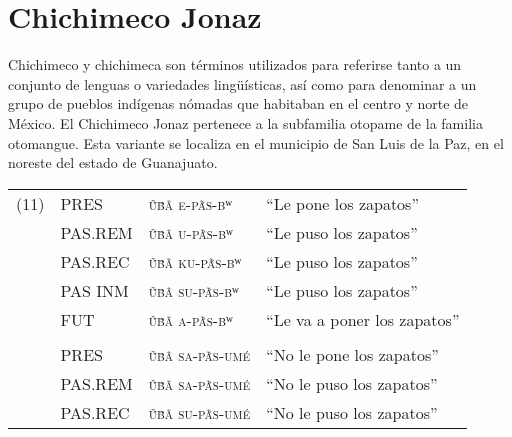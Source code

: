 \section*{Chichimeco Jonaz}

\noindent Chichimeco y chichimeca son términos utilizados para referirse tanto a un conjunto de lenguas o variedades lingüísticas, así como para denominar a un grupo de pueblos indígenas nómadas que habitaban en el centro y norte de México. El Chichimeco Jonaz pertenece a la subfamilia otopame de la familia otomangue. Esta variante se localiza en el municipio de San Luis de la Paz, en el noreste del estado de Guanajuato. \vspace{1cm}

{\setmainfont{Doulos SIL}
    \begin{tabular}{rlrr}
        \multicolumn{1}{l}{(11)} & PRES       & \multicolumn{1}{l}{\textsc{ṹβ̃ã e-pã́s-βʷ}}           & \multicolumn{1}{l}{“Le pone los zapatos”}          \\
                                 & PAS.REM    & \multicolumn{1}{l}{\textsc{ṹβ̃ã u-pã́s-βʷ}}           & \multicolumn{1}{l}{“Le puso los zapatos”}          \\
                                 & PAS.REC    & \multicolumn{1}{l}{\textsc{ṹβ̃ã ku-pã́s-βʷ}}          & \multicolumn{1}{l}{“Le puso los zapatos”}          \\
                                 & PAS INM    & \multicolumn{1}{l}{\textsc{ṹβ̃ã su-pã́s-βʷ}}          & \multicolumn{1}{l}{“Le puso los zapatos”}          \\
                                 & FUT        & \multicolumn{1}{l}{\textsc{ṹβ̃ã a-pã́s-βʷ}}           & \multicolumn{1}{l}{“Le va a poner los zapatos”}    \\
                                 &            &                                                     &                                                    \\
                                 & PRES       & \multicolumn{1}{l}{\textsc{ṹβ̃ã sa-pã́s-umé}}         & \multicolumn{1}{l}{“No le pone los zapatos”}       \\
                                 & PAS.REM    & \multicolumn{1}{l}{\textsc{ṹβ̃ã sa-pã́s-umé}}         & \multicolumn{1}{l}{“No le puso los zapatos”}       \\
                                 & PAS.REC    & \multicolumn{1}{l}{\textsc{ṹβ̃ã su-pã́s-umé}}         & \multicolumn{1}{l}{“No le puso los zapatos”}       \\

\end{tabular}}
